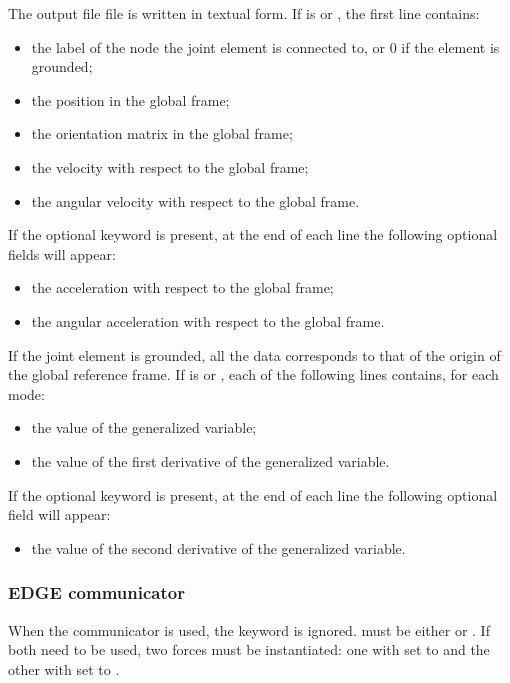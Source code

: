 The output file file is written in textual form.
If  is  or , the first line contains:
\begin{itemize}
\item the label of the  node the  joint element
	is connected to, or 0 if the element is grounded;
\item the position in the global frame;
\item the orientation matrix in the global frame;
\item the velocity with respect to the global frame;
\item the angular velocity with respect to the global frame.
\end{itemize}
If the optional keyword  is present,
at the end of each line the following optional fields will appear:
\begin{itemize}
\item the acceleration with respect to the global frame;
\item the angular acceleration with respect to the global frame.
\end{itemize}
If the  joint element is grounded, all the data corresponds
to that of the origin of the global reference frame.
If  is  or , each of the following lines contains,
for each mode:
\begin{itemize}
\item the value of the generalized variable;
\item the value of the first derivative of the generalized variable.
\end{itemize}
If the optional keyword  is present,
at the end of each line the following optional field will appear:
\begin{itemize}
\item the value of the second derivative of the generalized variable.
\end{itemize}



\subsubsection{EDGE communicator}
When the  communicator is used,
the  keyword is ignored.
 must be either  or .
If both need to be used, two  forces must be instantiated:
one with  set to 
and the other with  set to .

